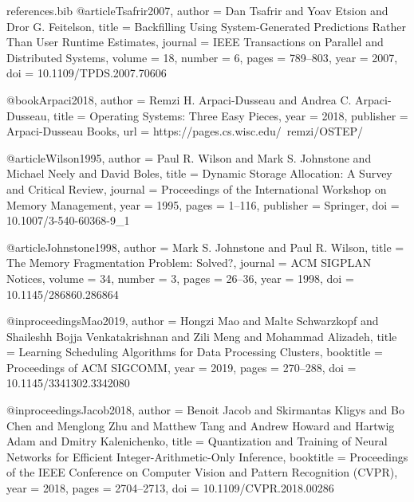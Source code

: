 \begin{filecontents*}{references.bib}
@article{Tsafrir2007,
  author    = {Dan Tsafrir and Yoav Etsion and Dror G. Feitelson},
  title     = {Backfilling Using System-Generated Predictions Rather Than User Runtime Estimates},
  journal   = {IEEE Transactions on Parallel and Distributed Systems},
  volume    = {18},
  number    = {6},
  pages     = {789--803},
  year      = {2007},
  doi       = {10.1109/TPDS.2007.70606}
}

@book{Arpaci2018,
  author    = {Remzi H. Arpaci-Dusseau and Andrea C. Arpaci-Dusseau},
  title     = {Operating Systems: Three Easy Pieces},
  year      = {2018},
  publisher = {Arpaci-Dusseau Books},
  url       = {https://pages.cs.wisc.edu/~remzi/OSTEP/}
}

@article{Wilson1995,
  author    = {Paul R. Wilson and Mark S. Johnstone and Michael Neely and David Boles},
  title     = {Dynamic Storage Allocation: A Survey and Critical Review},
  journal   = {Proceedings of the International Workshop on Memory Management},
  year      = {1995},
  pages     = {1--116},
  publisher = {Springer},
  doi       = {10.1007/3-540-60368-9_1}
}

@article{Johnstone1998,
  author    = {Mark S. Johnstone and Paul R. Wilson},
  title     = {The Memory Fragmentation Problem: Solved?},
  journal   = {ACM SIGPLAN Notices},
  volume    = {34},
  number    = {3},
  pages     = {26--36},
  year      = {1998},
  doi       = {10.1145/286860.286864}
}

@inproceedings{Mao2019,
  author    = {Hongzi Mao and Malte Schwarzkopf and Shaileshh Bojja Venkatakrishnan and Zili Meng and Mohammad Alizadeh},
  title     = {Learning Scheduling Algorithms for Data Processing Clusters},
  booktitle = {Proceedings of ACM SIGCOMM},
  year      = {2019},
  pages     = {270--288},
  doi       = {10.1145/3341302.3342080}
}




@inproceedings{Jacob2018,
  author    = {Benoit Jacob and Skirmantas Kligys and Bo Chen and Menglong Zhu and Matthew Tang and Andrew Howard and Hartwig Adam and Dmitry Kalenichenko},
  title     = {Quantization and Training of Neural Networks for Efficient Integer-Arithmetic-Only Inference},
  booktitle = {Proceedings of the IEEE Conference on Computer Vision and Pattern Recognition (CVPR)},
  year      = {2018},
  pages     = {2704--2713},
  doi       = {10.1109/CVPR.2018.00286}
}


\end{filecontents*}
